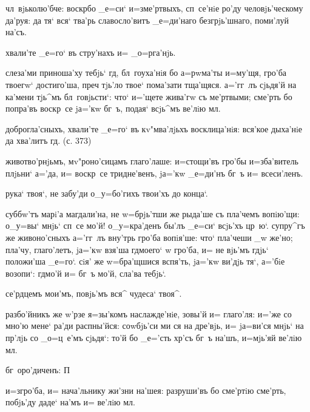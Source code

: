 чл~вjьколю'бче: воскр бо _е=си` и=з\ъ ме'ртвыхъ, 
сп~се'нiе ро'ду человjь'ческому да'руя: да тя` вся` 
тва'рь славосло'витъ _е=ди'наго безгрjь'шнаго, поми'луй 
на'съ.


хвали'те _е=го` въ стру'нахъ и= _о=рга'нjь.

слеза'ми приноша'ху тебjь` гд, бл~гоуха'нiя бо 
а=рwма'ты и=му'щя, гро'ба твоегw` достиго'ша, преч 
тjь'ло твое` пома'зати тща'щяся. а='гг~лъ сjьдя'й на 
ка'мени тjь^мъ бл~говjьсти`: что` и='щете жива'гw съ 
ме'ртвыми; сме'рть бо попра'въ воскр~се jа='кw бг~ъ, 
подая` всjь^мъ ве'лiю мл.

доброгла'сныхъ, хвали'те _е=го` въ кv"мва'лjьхъ 
восклица'нiя: вся'кое дыха'нiе да хва'литъ гд. (с. 
373)

животво'рнjьмъ, мv"роно'сицамъ глаго'лаше: и=стощи'въ 
гро'бы и=зба'витель плjьни` а='да, и= воскр~се 
тридне'венъ, jа='кw _е=ди'нъ бг~ъ и= всеси'ленъ.

рука` твоя`, не забу'ди о_у=бо'гихъ твои'хъ до конца`.

суббw'тъ марi'а магдали'на, не w=брjь'тши же рыда'ше съ 
пла'чемъ вопiю'щи: о_у=вы` мнjь` сп~се мо'й! о_у=кра'денъ 
бы'лъ _е=си` всjь'хъ цр~ю`. супру^гъ же живоно'сныхъ 
а='гг~лъ вну'трь гро'ба вопiя'ше: что` пла'чеши _w же'но; 
пла'чу, глаго'летъ, jа='кw взя'ша гд моего` w\т 
гро'ба, и= не вjь'мъ гдjь` положи'ша _е=го`. сiя' же 
w=бра'щшися вспя'ть, jа='кw ви'дjь тя`, а='бiе возопи`: 
гд мо'й и= бг~ъ мо'й, сла'ва тебjь`.

се'рдцемъ мои'мъ, повjь'мъ вся^ чудеса` твоя^.

разбо'йникъ же w'рзе я=зы'комъ наслажде'нiе, зовы'й 
и= глаго'ля: и='же со мно'ю мене` ра'ди распны'йся: 
соwбjь'си ми ся на дре'вjь, и= jа=ви'ся мнjь` на 
пр'лjь со _о=ц~е'мъ сjьдя`: то'й бо _е='сть хр'съ 
бг~ъ на'шъ, и=мjь'яй ве'лiю мл.

бг~оро'диченъ: П%


и=з\ъ гро'ба, и= нача'льнику жи'зни на'шея: разруши'въ бо 
сме'ртiю сме'рть, побjь'ду даде` на'мъ и= ве'лiю мл.


